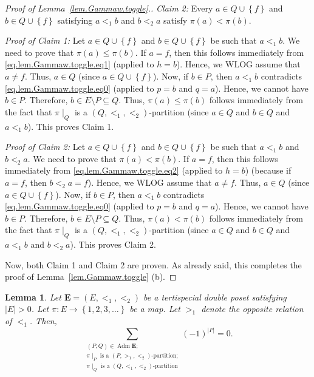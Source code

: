 \documentclass[12pt]{article}
\theoremstyle{plain}
\newtheorem{lemma}[theorem]{Lemma}
\theoremstyle{definition}
\theoremstyle{remark}
\let\sumnonlimits\sum
\renewcommand{\sum}{\sumnonlimits\limits}
\newcommand{\Adm}{\operatorname{Adm}}
\newcommand{\EE}{{\mathbf{E}}}
\begin{document}
\begin{proof}[Proof of Lemma~\ref{lem.Gammaw.toggle}.]
\textit{Claim 2:} Every $a\in Q\cup\left\{  f\right\}  $ and $b\in
Q\cup\left\{  f\right\}  $ satisfying $a<_{1}b$ and $b<_{2}a$ satisfy
$\pi\left(  a\right)  <\pi\left(  b\right)  $.

\textit{Proof of Claim 1:} Let $a\in Q\cup\left\{  f\right\}  $ and $b\in
Q\cup\left\{  f\right\}  $ be such that $a<_{1}b$. We need to prove that
$\pi\left(  a\right)  \leq\pi\left(  b\right)  $. If $a=f$, then this follows
immediately from \eqref{eq.lem.Gammaw.toggle.eq1} (applied to $h=b$).
Hence, we WLOG assume that $a\neq f$. Thus, $a\in Q$ (since $a\in
Q\cup\left\{  f\right\}  $). Now, if $b\in P$, then $a<_{1}b$ contradicts
\eqref{eq.lem.Gammaw.toggle.eq0} (applied to $p=b$ and $q=a$). Hence,
we cannot have $b\in P$. Therefore, $b\in E\setminus P
\subseteq Q$. Thus, $\pi\left(  a\right)  \leq\pi\left(
b\right)  $ follows immediately from the fact that $\pi\mid_{Q}$ is a $\left(
Q,<_{1},<_{2}\right)  $-partition (since $a \in Q$ and $b \in Q$ and
$a <_1 b$).
This proves Claim 1.

\textit{Proof of Claim 2:} Let $a\in Q\cup\left\{  f\right\}  $ and $b\in
Q\cup\left\{  f\right\}  $ be such that $a<_{1}b$ and $b<_{2}a$. We need to
prove that $\pi\left(  a\right)  <\pi\left(  b\right)  $. If $a=f$, then this
follows immediately from \eqref{eq.lem.Gammaw.toggle.eq2} (applied
to $h=b$) (because if $a = f$, then $b <_2 a = f$).
Hence, we WLOG assume that $a\neq f$. Thus, $a\in Q$ (since $a\in
Q\cup\left\{  f\right\}  $). Now, if $b\in P$, then $a<_{1}b$ contradicts
\eqref{eq.lem.Gammaw.toggle.eq0} (applied to $p=b$ and $q=a$). Hence,
we cannot have $b\in P$. Therefore, $b\in E\setminus P \subseteq Q$.
Thus, $\pi\left(  a\right)  <\pi\left(
b\right)  $ follows immediately from the fact that $\pi\mid_{Q}$ is a $\left(
Q,<_{1},<_{2}\right)  $-partition (since $a \in Q$ and $b \in Q$ and
$a <_1 b$ and $b <_2 a$).
This proves Claim 2.

Now, both Claim 1 and Claim 2 are proven. As already said, this
completes the proof of Lemma~\ref{lem.Gammaw.toggle} (b).
\end{proof}

\begin{lemma}
\label{lem.Gammaw.altsum}
Let $\EE = \left(E, <_1, <_2\right)$ be a tertispecial double
poset satisfying $\left|E\right| > 0$.
Let $\pi : E \to \left\{ 1, 2, 3, \ldots \right\}$ be a map.
Let $>_1$ denote the opposite relation of $<_1$. Then,
\begin{equation}
\sum_{\substack{\left(P, Q\right) \in \Adm \EE ; \\
                \pi\mid_P \text{ is a }\left(P, >_1, <_2\right)\text{-partition;} \\
                \pi\mid_Q \text{ is a }\left(Q, <_1, <_2\right)\text{-partition}}}
\left(-1\right)^{\left|P\right|}
= 0 .
\label{pf.thm.antipode.Gammaw.signrev}
\end{equation}
\end{lemma}
\end{document}
